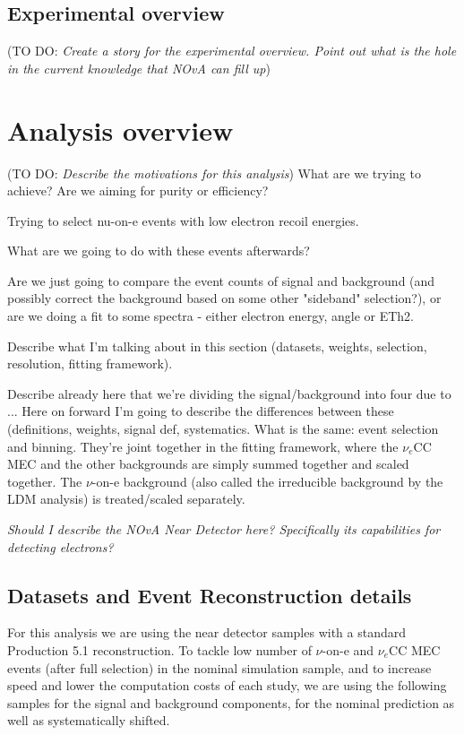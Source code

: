 \documentclass[12pt]{article}
\newcommand{\todo }[1]{({\color{red}\sc TO DO: \textit{#1}})}
\begin{document}
\subsection{Experimental overview}
\todo{Create a story for the experimental overview. Point out what is the hole in the current knowledge that NOvA can fill up}


\section{Analysis overview}
\todo{Describe the motivations for this analysis}
What are we trying to achieve? Are we aiming for purity or efficiency?

Trying to select nu-on-e events with low electron recoil energies.

What are we going to do with these events afterwards? 

Are we just going to compare the event counts of signal and background (and possibly correct the background based on some other "sideband" selection?), or are we doing a fit to some spectra - either electron energy, angle or ETh2.

Describe what I'm talking about in this section (datasets, weights, selection, resolution, fitting framework).

Describe already here that we're dividing the signal/background into four due to ... Here on forward I'm going to describe the differences between these (definitions, weights, signal def, systematics. What is the same: event selection and binning. They're joint together in the fitting framework, where the $\nu_e$CC MEC and the other backgrounds are simply summed together and scaled together. The $\nu$-on-e background (also called the irreducible background by the LDM analysis) is treated/scaled separately.

\textit{Should I describe the NOvA Near Detector here? Specifically its capabilities for detecting electrons?}

\subsection{Datasets and Event Reconstruction details}
For this analysis we are using the near detector samples with a standard Production 5.1 reconstruction. To tackle low number of $\nu$-on-e and $\nu_e$CC MEC events (after full selection) in the nominal simulation sample, and to increase speed and lower the computation costs of each study, we are using the following samples for the signal and background components, for the nominal prediction as well as systematically shifted.
\end{document}
